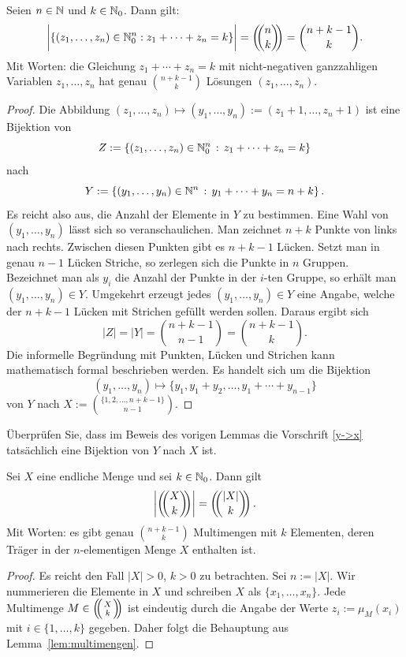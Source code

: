 \begin{lem} \label{lem:multimengen}
	Seien $n \in \mathbb{N}$ und $k \in \mathbb{N}_0$. Dann gilt: 
	\[
		\biggl| \left\{ (z_1,\ldots,z_n) \in \mathbb{N}_0^n : z_1 + \cdots + z_n = k \right\} \biggr| = \left(\!\!\binom{n}{k}\!\!\right) = \binom{n+k-1}{k}. 
	\]
	Mit Worten: die Gleichung $z_1 + \cdots + z_n = k$ mit nicht-negativen ganzzahligen Variablen $z_1,\ldots,z_n$ hat genau $\binom{n+k-1}{k}$ Lösungen $(z_1,\ldots,z_n)$. 
\end{lem} 
\begin{proof} 
	Die Abbildung $(z_1,\ldots,z_n) \mapsto (y_1,\ldots,y_n):=(z_1+1,\ldots,z_n+1)$ ist eine Bijektion von 
	\[
			Z:=\left\{  (z_1,\ldots,z_n) \in \mathbb{N}_0^n \,:\, z_1 + \cdots + z_n = k \right\}
	\]
	nach 
	\[
			Y:= \left\{  (y_1,\ldots,y_n) \in \mathbb{N}^n \,:\, y_1 + \cdots + y_n = n+ k \right\}. 
	\]
	Es reicht also aus, die Anzahl der Elemente in $Y$ zu bestimmen. Eine Wahl von $(y_1,\ldots,y_n)$ lässt sich so veranschaulichen. Man zeichnet $n+k$ Punkte von links nach rechts. Zwischen diesen Punkten gibt es $n+k-1$ Lücken. Setzt man in genau $n-1$ Lücken Striche, so zerlegen sich die Punkte in $n$ Gruppen. Bezeichnet man als $y_i$ die Anzahl der Punkte in der $i$-ten Gruppe, so erhält man $(y_1,\ldots,y_n) \in Y$. Umgekehrt erzeugt jedes $(y_1,\ldots,y_n) \in Y$ eine Angabe, welche der $n+k-1$ Lücken mit Strichen gefüllt werden sollen. Daraus ergibt sich 
	\[
			|Z| = |Y|= \binom{n+k-1}{n-1} = \binom{n+k-1}{k}. 
	\]
	Die informelle Begründung mit Punkten, Lücken und Strichen kann mathematisch formal beschrieben werden. Es handelt sich um die Bijektion 
	\begin{equation}\label{y->x}
		(y_1,\ldots,y_n) \mapsto \{y_1,y_1+y_2,\ldots, y_1+ \cdots +y_{n-1}\}
	\end{equation}
	 von $Y$ nach 
	\(
			X:=\binom{\{1,2,\ldots,n+k-1\}}{n-1}. 
	\)
\end{proof} 

\begin{aufg}
	Überprüfen Sie, dass im Beweis des vorigen Lemmas die Vorschrift \eqref{y->x} tatsächlich eine Bijektion von $Y$ nach $X$ ist. 
\end{aufg} 

\begin{thm}
	Sei $X$ eine endliche Menge und sei $k \in \mathbb{N}_0$. Dann gilt 
	\[
			\left| \mbinom{X}{k} \right| = \mbinom{|X|}{k}. 
	\]
	Mit Worten: es gibt genau $\binom{n+k-1}{k}$ Multimengen mit $k$ Elementen, deren Träger in der $n$-elementigen Menge $X$ enthalten ist. 
\end{thm}
\begin{proof}
	Es reicht den Fall $|X| >0$, $k>0$ zu betrachten. Sei $n:= |X|$. Wir nummerieren die Elemente in $X$ und schreiben $X$ als $\{x_1,\ldots,x_n\}$. Jede Multimenge $M \in \multiset{X}{k}$ ist eindeutig durch die Angabe der Werte $z_i := \mu_M(x_i)$ mit $i \in \{1,\ldots,k\}$ gegeben. Daher folgt die Behauptung aus Lemma~\ref{lem:multimengen}. 
\end{proof} 

